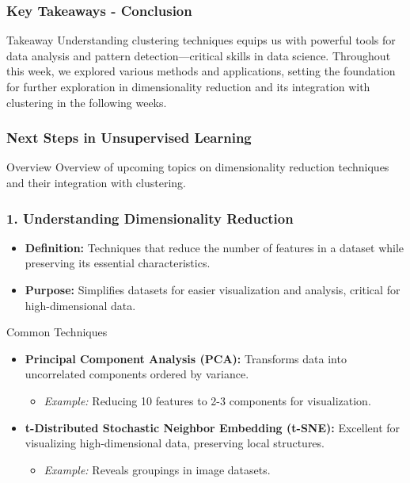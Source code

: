 \documentclass[aspectratio=169]{beamer}
\begin{document}
\begin{frame}[fragile]
    \frametitle{Key Takeaways - Conclusion}
    \begin{block}{Takeaway}
        Understanding clustering techniques equips us with powerful tools for data analysis and pattern detection—critical skills in data science. Throughout this week, we explored various methods and applications, setting the foundation for further exploration in dimensionality reduction and its integration with clustering in the following weeks.
    \end{block}
\end{frame}

\begin{frame}[fragile]
    \frametitle{Next Steps in Unsupervised Learning}
    \begin{block}{Overview}
        Overview of upcoming topics on dimensionality reduction techniques and their integration with clustering.
    \end{block}
\end{frame}

\begin{frame}[fragile]
    \frametitle{1. Understanding Dimensionality Reduction}
    \begin{itemize}
        \item \textbf{Definition:} Techniques that reduce the number of features in a dataset while preserving its essential characteristics.
        \item \textbf{Purpose:} Simplifies datasets for easier visualization and analysis, critical for high-dimensional data.
    \end{itemize}
    
    \begin{block}{Common Techniques}
        \begin{itemize}
            \item \textbf{Principal Component Analysis (PCA):} Transforms data into uncorrelated components ordered by variance.
            \begin{itemize}
                \item \textit{Example:} Reducing 10 features to 2-3 components for visualization.
            \end{itemize}
            \item \textbf{t-Distributed Stochastic Neighbor Embedding (t-SNE):} Excellent for visualizing high-dimensional data, preserving local structures.
            \begin{itemize}
                \item \textit{Example:} Reveals groupings in image datasets.
            \end{itemize}
        \end{itemize}
    \end{block}
\end{frame}
\end{document}
